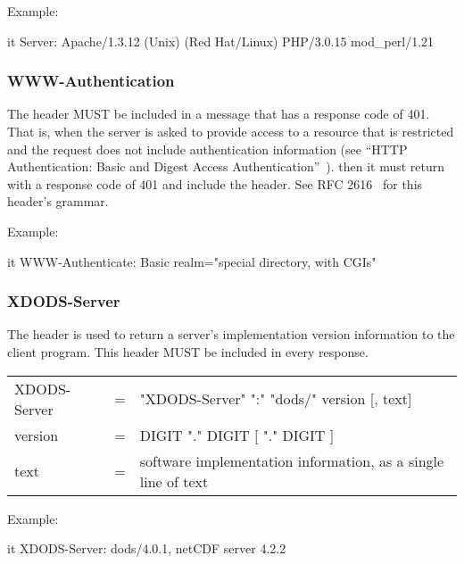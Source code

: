 \documentclass[justify]{dods-paper}
\begin{document}
Example:

\begin{vcode}{it}
Server: Apache/1.3.12 (Unix)  (Red Hat/Linux) PHP/3.0.15 mod_perl/1.21
\end{vcode}

\subsubsection{WWW-Authentication}

The  header MUST be included in a message that has a
response code of 401. That is, when the \DAP server is asked to provide
access to a resource that is restricted and the request does not include
authentication information (see ``HTTP Authentication: Basic and Digest
Access Authentication''~\cite{rfc2617}). then it must return with a response
code of 401 and include the  header. See RFC
2616~\cite{rfc2616} for this header's grammar.

Example:

\begin{vcode}{it}
WWW-Authenticate: Basic realm="special directory, with CGIs"
\end{vcode}

\subsubsection{XDODS-Server}

The  header is used to return a \DAP server's
implementation version information to the client program.  This header
MUST be included in every response. 

\begin{ttfamily}
\begin{center}
\begin{tabular}{lll}
XDODS-Server & = & "XDODS-Server" ":" "dods/" version [, text] \\
version & = & DIGIT "." DIGIT [ "." DIGIT ] \\
text & = & software implementation information, as a single line of text
\end{tabular}
\end{center}
\end{ttfamily}

Example:

\begin{vcode}{it}
XDODS-Server: dods/4.0.1, netCDF server 4.2.2
\end{vcode}
\end{document}
